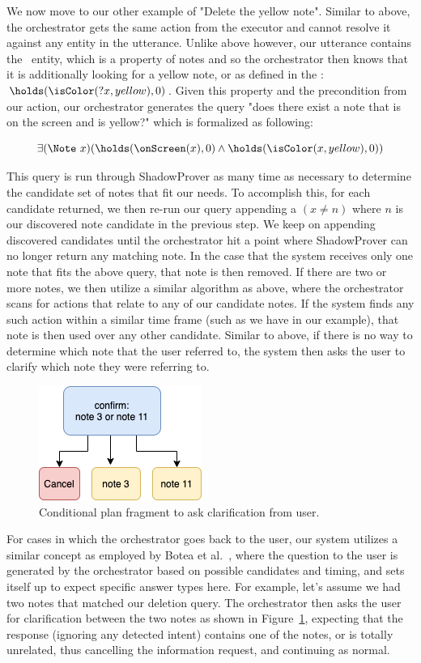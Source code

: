 We now move to our other example of "Delete the yellow note". Similar to above, the orchestrator
gets the same action from the executor and cannot resolve it against any entity in the utterance.
Unlike above however, our utterance contains the \Color\ entity, which is a property of notes and so the
orchestrator then knows that it is additionally looking for a yellow note, or as defined in the
\CEC: $\holds(\isColor(?x, yellow), 0)$. Given this property and the precondition from our action,
our orchestrator generates the query "does there exist a note that is on the screen and is
yellow?" which is formalized as following:

\begin{equation*}
    \exists (\Note\ x) (\holds(\onScreen(x), 0) \land \holds(\isColor(x, yellow), 0))
\end{equation*}

This query is run through \textsf{ShadowProver} as many time as necessary to determine
the candidate set of notes that fit our needs. To accomplish this, for each candidate
returned, we then re-run our query appending a $(x \neq n)$ where $n$ is our discovered
note candidate in the previous step. We keep on appending discovered candidates until the orchestrator
hit a point where \textsf{ShadowProver} can no longer return any matching note. In the case
that the system receives only one note that fits the above query, that note is then removed.
If there are two or more notes, we then utilize a similar algorithm as above, where the
orchestrator scans for actions that relate to any of our candidate notes. If the system
finds any such action within a similar time frame (such as we have in our example), that note
is then used over any other candidate. Similar to above, if there is no way to determine
which note that the user referred to, the system then asks the user to clarify which
note they were referring to.

\begin{figure}
\centering
  \includegraphics[width=0.3\columnwidth]{chapters/06_planning/figures/intent_resolution_fragment.png}
  \caption{Conditional plan fragment to ask clarification from user.}
  \label{fig:intent_resolution_fragment}
\end{figure}

For cases in which the orchestrator goes back to the user, our system utilizes a similar concept
as employed by Botea et al.~\cite{botea_generating_2019}, where the question to the user
is generated by the orchestrator based on possible candidates and timing, and sets itself up
to expect specific answer types here. For example, let's assume we had two notes that matched
our deletion query. The orchestrator then asks the user for clarification between the two notes
as shown in Figure~\ref{fig:intent_resolution_fragment}, expecting that the response (ignoring
any detected intent) contains one of the notes, or is totally unrelated, thus cancelling the
information request, and continuing as normal. 
